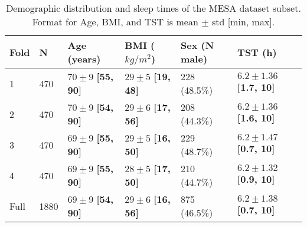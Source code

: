 \renewcommand{\arraystretch}{1.5}
\begin{table}
    \centering
    \begin{tabular}{p{1cm} p{1cm} p{1.7cm} p{1.7cm} p{1.7cm} p{1.7cm}}
        Fold & N & Age \newline (years) & BMI \newline ($kg/m^2$) & Sex \newline (N male) & TST \newline (h) \\
        \hline
        1 & 470 & $70\pm9$ \newline \textbf{[55, 90]} & $29\pm5$ \newline \textbf{[19, 48]} & 228 \newline (48.5\%) & $6.2\pm1.36$ \newline \textbf{[1.7, 10]} \\
        2 & 470 & $70\pm9$ \newline \textbf{[54, 90]} & $29\pm6$ \newline \textbf{[17, 56]} & 208 \newline (44.3\%) & $6.2\pm1.36$ \newline \textbf{[1.6, 10]} \\
        3 & 470 & $69\pm9$ \newline \textbf{[55, 90]} & $29\pm5$ \newline \textbf{[16, 50]} & 229 \newline (48.7\%) & $6.2\pm1.47$ \newline \textbf{[0.7, 10]} \\
        4 & 470 & $69\pm9$ \newline \textbf{[55, 90]} & $28\pm5$ \newline \textbf{[17, 50]} & 210 \newline (44.7\%) & $6.2\pm1.32$ \newline \textbf{[0.9, 10]} \\
        \hline
        Full & 1880 & $69\pm9$ \newline \textbf{[54, 90]} & $29\pm6$ \newline \textbf{[16, 56]} & 875 \newline (46.5\%) & $6.2\pm1.38$ \newline \textbf{[0.7, 10]} \\
    \end{tabular}
    \caption{Demographic distribution and sleep times of the MESA dataset subset. Format for Age, BMI, and TST is mean $\pm$ std [min, max]. \label{tab:dataset-demographics}}
\end{table}

